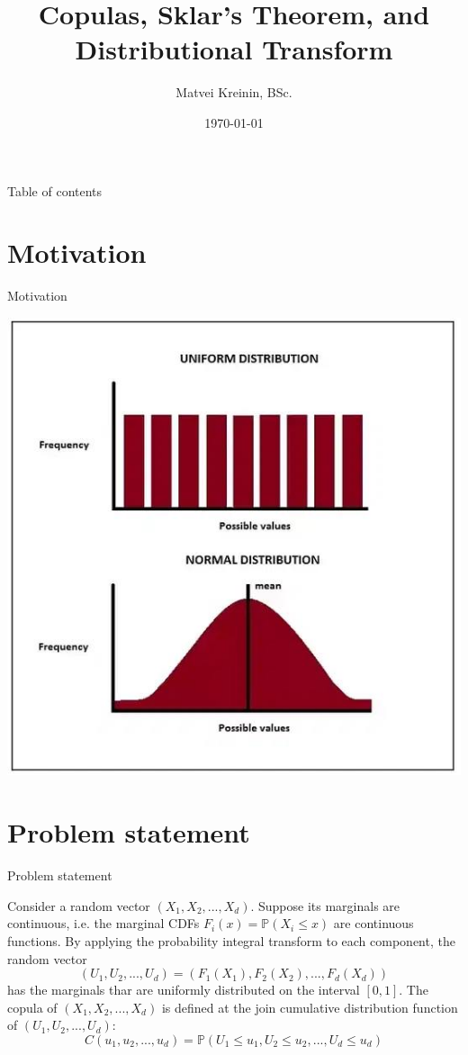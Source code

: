 \documentclass[aspectratio=169, 12pt]{beamer}
\title[\hbox to 56mm{Feature}]{Copulas, Sklar’s Theorem, and Distributional
Transform}
\author[M.\,K.~Kreinin]{Matvei Kreinin, BSc.}
\institute{Moscow Institute of Physics and Technology}
\date{\today}
\begin{document}
\maketitle

\begin{frame}{Table of contents}
    \tableofcontents
\end{frame}

\section{Motivation}
\begin{frame}{Motivation}
\begin{center}
    \includegraphics[scale=0.4]{2024-09-23 23.24.49.jpg}
\end{center}
\end{frame}


\section{Problem statement}
\begin{frame}{Problem statement}
    \begin{definition}
        Consider a random vector $(X_1, X_2, ..., X_d)$. Suppose its marginals are continuous, i.e. the marginal CDFs $F_i(x) = \mathbb{P}(X_i \leq x) $ are continuous functions. By applying the probability integral transform to each component, the random vector
        $$
        (U_1, U_2, ..., U_d) = (F_1(X_1), F_2(X_2), ..., F_d(X_d)) 
        $$ has the marginals thar are uniformly distributed on the interval $[0, 1]$.
        The copula of $(X_1, X_2, ..., X_d)$ is defined at the join cumulative distribution function of $(U_1, U_2, ..., U_d)$:
        $$
        C(u_1, u_2, ..., u_d) = \mathbb{P}(U_1 \leq u_1, U_2 \leq u_2, ..., U_d \leq u_d)
        $$
    \end{definition}
\end{frame}
\end{document}
